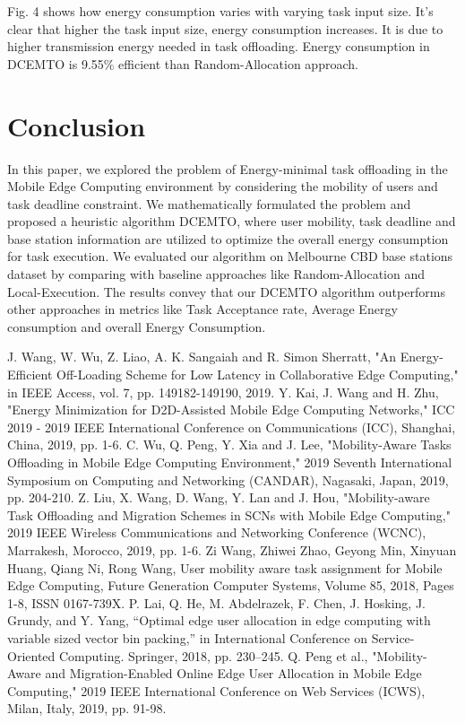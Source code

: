 \documentclass[conference]{IEEEtran}
\begin{document}
Fig. 4 shows how energy consumption varies with varying task input size. It’s clear that higher the task input size, energy consumption increases. It is due to higher transmission energy needed in task offloading. Energy consumption in DCEMTO is 9.55\% efficient than Random-Allocation approach.


\section{Conclusion}
In this paper, we explored the problem of Energy-minimal task offloading in the Mobile Edge Computing environment by considering the mobility of users and task deadline constraint. We mathematically formulated the problem and proposed a heuristic algorithm DCEMTO, where user mobility, task deadline and base station information are utilized to optimize the overall energy consumption for task execution. We evaluated our algorithm on Melbourne CBD base stations dataset by comparing with baseline approaches like Random-Allocation and Local-Execution. The results convey that our DCEMTO algorithm outperforms other approaches in metrics like Task Acceptance rate, Average Energy consumption and overall Energy Consumption.

\begin{thebibliography}{00}
 J. Wang, W. Wu, Z. Liao, A. K. Sangaiah and R. Simon Sherratt, "An Energy-Efficient Off-Loading Scheme for Low Latency in Collaborative Edge Computing," in IEEE Access, vol. 7, pp. 149182-149190, 2019.
 Y. Kai, J. Wang and H. Zhu, "Energy Minimization for D2D-Assisted Mobile Edge Computing Networks," ICC 2019 - 2019 IEEE International Conference on Communications (ICC), Shanghai, China, 2019, pp. 1-6.
 C. Wu, Q. Peng, Y. Xia and J. Lee, "Mobility-Aware Tasks Offloading in Mobile Edge Computing Environment," 2019 Seventh International Symposium on Computing and Networking (CANDAR), Nagasaki, Japan, 2019, pp. 204-210.
 Z. Liu, X. Wang, D. Wang, Y. Lan and J. Hou, "Mobility-aware Task Offloading and Migration Schemes in SCNs with Mobile Edge Computing," 2019 IEEE Wireless Communications and Networking Conference (WCNC), Marrakesh, Morocco, 2019, pp. 1-6.
 Zi Wang, Zhiwei Zhao, Geyong Min, Xinyuan Huang, Qiang Ni, Rong Wang, User mobility aware task assignment for Mobile Edge Computing, Future Generation Computer Systems, Volume 85, 2018, Pages 1-8, ISSN 0167-739X.
 P. Lai, Q. He, M. Abdelrazek, F. Chen, J. Hosking, J. Grundy, and Y. Yang, “Optimal edge user allocation in edge computing with variable sized vector bin packing,” in International Conference on Service-Oriented Computing. Springer, 2018, pp. 230–245.
 Q. Peng et al., "Mobility-Aware and Migration-Enabled Online Edge User Allocation in Mobile Edge Computing," 2019 IEEE International Conference on Web Services (ICWS), Milan, Italy, 2019, pp. 91-98.
\end{thebibliography}
\end{document}
